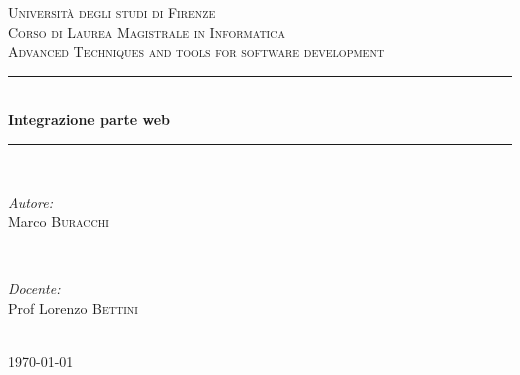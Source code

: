 \documentclass[12pt]{article}
\begin{document}

\begin{titlepage}

\newcommand{\HRule}{\rule{\linewidth}{0.5mm}}

\center

\textsc{\LARGE Università degli studi di Firenze}\\[1.5cm]
\textsc{\Large Corso di Laurea Magistrale in Informatica}\\[0.5cm]
\textsc{\large Advanced Techniques and tools for software development}\\[0.5cm]

\HRule \\[0.4cm]
{ \huge \bfseries Integrazione parte web}\\[0.4cm]
\HRule \\[1.5cm]

\begin{minipage}{0.4\textwidth}
	\begin{flushleft} \large
		\emph{Autore:}\\
		Marco \textsc{Buracchi}
	\end{flushleft}
\end{minipage}
~
\begin{minipage}{0.4\textwidth}
	\begin{flushright} \large
		\emph{Docente:} \\
		Prof Lorenzo \textsc{Bettini}
	\end{flushright}
\end{minipage}\\[4cm]

{\large \today}\\[3cm] %
\vfill %

\end{titlepage}

\tableofcontents
\newpage
\end{document}
